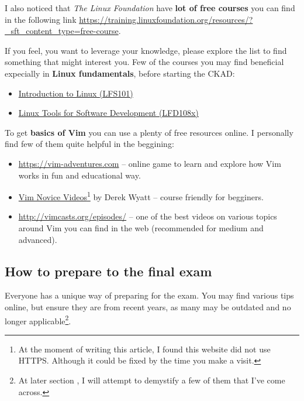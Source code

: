 I also noticed that \textit{The Linux Foundation} have \textbf{lot of free courses} you can find in the following link \url{https://training.linuxfoundation.org/resources/?_sft_content_type=free-course}.

If you feel, you want to leverage your knowledge, please explore the list to find something that might interest you. Few of the courses you may find beneficial expecially in \textbf{Linux fundamentals}, before starting the CKAD:

\begin{itemize}
	\item \href{https://training.linuxfoundation.org/training/introduction-to-linux/}{Introduction to Linux (LFS101)}
	\item \href{https://training.linuxfoundation.org/training/linux-tools-for-software-development-lfd108x/}{Linux Tools for Software Development (LFD108x)}
\end{itemize}

To get \textbf{basics of Vim} you can use a plenty of free resources online. I personally find few of them quite helpful in the beggining:

\begin{itemize}
	\item \url{https://vim-adventures.com} -- online game to learn and explore how Vim works in fun and educational way.
	\item \href{http://derekwyatt.org/vim/tutorials/novice/}{Vim Novice Videos}\footnote{\label{no-https}At the moment of writing this article, I found this website did not use HTTPS. Although it could be fixed by the time you make a visit.} by Derek Wyatt -- course friendly for begginers.
	\item \url{http://vimcasts.org/episodes/} -- one of the best videos on various topics around Vim you can find in the web (recommended for medium and advanced).
\end{itemize}

\subsection{How to prepare to the final exam}

Everyone has a unique way of preparing for the exam. You may find various tips online, but ensure they are from recent years, as many may be outdated and no longer applicable\footnote{At later section , I will attempt to demystify a few of them that I’ve come across.}.

